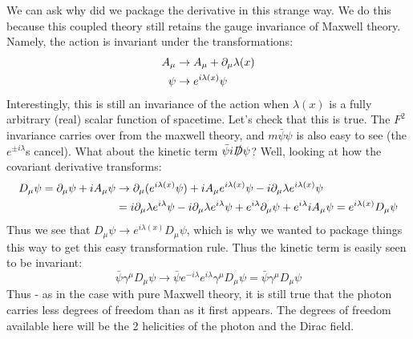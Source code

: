 We can ask why did we package the derivative in this strange way. We do this because this coupled theory still retains the gauge invariance of Maxwell theory. Namely, the action is invariant under the transformations:
\begin{equation}
    \begin{split}
        A_\mu &\to A_\mu + \partial_\mu \lambda(x)
        \\ \psi &\to e^{i\lambda(x)}\psi
    \end{split}
\end{equation}
Interestingly, this is still an invariance of the action when $\lambda(x)$ is a fully arbitrary (real) scalar function of spacetime. Let's check that this is true. The $F^2$ invariance carries over from the maxwell theory, and $m\bar{\psi}\psi$ is also easy to see (the $e^{\pm i\lambda}$s cancel). What about the kinetic term $\bar{\psi}i\slashed{D}\psi$? Well, looking at how the covariant derivative transforms:
\begin{equation}
    \begin{split}
        D_\mu \psi = \partial_\mu \psi + iA_\mu \psi &\to \partial_\mu (e^{i\lambda(x)}\psi) + iA_\mu e^{i\lambda(x)}\psi - i\partial_\mu \lambda e^{i\lambda(x)}\psi
        \\ &= i\partial_\mu \lambda e^{i\lambda}\psi - i\partial_\mu \lambda e^{i\lambda}\psi + e^{i\lambda}\partial_\mu \psi + e^{i\lambda}iA_\mu \psi = e^{i\lambda(x)}D_\mu \psi
    \end{split}
\end{equation}
Thus we see that $D_\mu \psi \to e^{i\lambda(x)}D_\mu\psi$, which is why we wanted to package things this way to get this easy transformation rule. Thus the kinetic term is easily seen to be invariant:
\begin{equation}
    \bar{\psi}\gamma^\mu D_\mu \psi \to \bar{\psi}e^{-i\lambda}e^{i\lambda}\gamma^\mu D_\mu \psi = \bar{\psi}\gamma^\mu D_\mu \psi
\end{equation}
Thus - as in the case with pure Maxwell theory, it is still true that the photon carries less degrees of freedom than as it first appears. The degrees of freedom available here will be the 2 helicities of the photon and the Dirac field.

